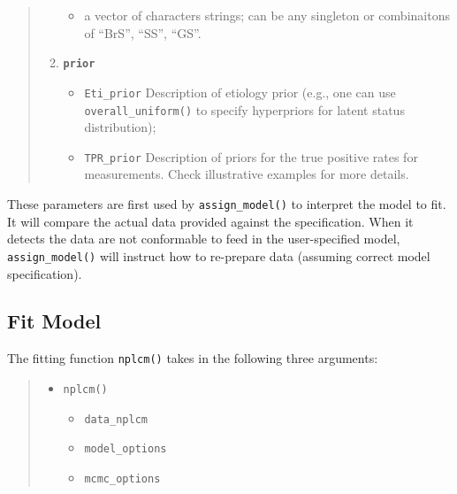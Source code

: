 \documentclass[article]{jss}
\begin{document}
\begin{quote}
\begin{enumerate}
  \begin{itemize}
  \itemsep1pt\parskip0pt
  \item
    a vector of characters strings; can be any singleton or combinaitons
    of ``BrS'', ``SS'', ``GS''.
  \end{itemize}
\item
  \textbf{\texttt{prior}}

  \begin{itemize}
  \itemsep1pt\parskip0pt
  \item
    \texttt{Eti\_prior} Description of etiology prior (e.g., one can use
    \texttt{overall\_uniform()} to specify hyperpriors for latent status
    distribution);
  \item
    \texttt{TPR\_prior} Description of priors for the true positive
    rates for measurements. Check illustrative examples for more
    details.
  \end{itemize}
\end{enumerate}
\end{quote}

These parameters are first used by \texttt{assign\_model()} to interpret
the model to fit. It will compare the actual data provided against the
specification. When it detects the data are not conformable to feed in
the user-specified model, \texttt{assign\_model()} will instruct how to
re-prepare data (assuming correct model specification).

\subsection{Fit Model}\label{fit-model}

The fitting function \texttt{nplcm()} takes in the following three
arguments:

\begin{quote}
\begin{itemize}
\itemsep1pt\parskip0pt
\item
  \texttt{nplcm()}

  \begin{itemize}
  \itemsep1pt\parskip0pt
  \item
    \texttt{data\_nplcm}
  \item
    \texttt{model\_options}
  \item
    \texttt{mcmc\_options}
  \end{itemize}
\end{itemize}
\end{quote}
\end{document}
